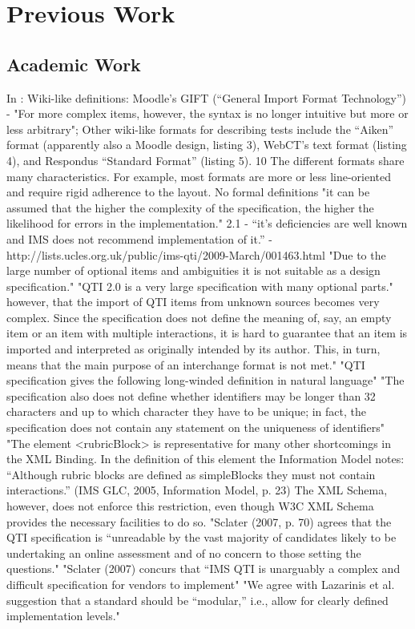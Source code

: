 \chapter{Previous Work} 
\label{Chapter:Previous Work}
\section{Academic Work} 
\label{Section:Academic Work}

\newif\ifnote
\notefalse
\ifnote
In \cite{failQTI}:
Wiki-like definitions: Moodle’s GIFT (“General Import Format Technology”) - "For more complex items, however, the syntax is no longer intuitive but more or less arbitrary"; Other wiki-like formats for describing tests include the “Aiken” format (apparently also a Moodle design, listing 3), WebCT’s text format (listing 4), and Respondus “Standard Format” (listing 5). 10 The different formats share many characteristics. For example, most formats are more or less line-oriented and require rigid adherence to the layout. No formal definitions
"it can be assumed that the higher the complexity of the specification, the higher the likelihood for errors in the implementation."
2.1 - “it’s deficiencies are well known and IMS does not recommend implementation of it.” - http://lists.ucles.org.uk/public/ims-qti/2009-March/001463.html
"Due to the large number of optional items and ambiguities it is not suitable as a design specification."
"QTI 2.0 is a very large specification with many optional parts."
however, that the import of QTI items from unknown sources becomes very complex. Since the
specification does not define the meaning of, say, an empty item or an item with multiple interactions,
it is hard to guarantee that an item is imported and interpreted as originally intended by its author. This,
in turn, means that the main purpose of an interchange format is not met."
"QTI specification gives the following long-winded definition in natural language"
"The specification also does not define whether identifiers may be longer than 32 characters and up to which character they have to be unique; in fact, the specification does not contain any statement on the uniqueness of identifiers"
"The element <rubricBlock> is representative for many other shortcomings in the XML Binding. In the definition of this element the Information Model notes: “Although rubric blocks are defined as simpleBlocks they must not contain interactions.” (IMS GLC, 2005, Information Model, p. 23) The XML Schema, however, does not enforce this restriction, even though W3C XML Schema provides the necessary facilities to do so.
"Sclater (2007, p. 70) agrees that the QTI specification is “unreadable by the vast majority of candidates likely to be undertaking an online assessment and of no concern to those setting the questions."
"Sclater (2007) concurs that “IMS QTI is unarguably a complex and difficult specification for
vendors to implement" \citep{Sclater2007}
"We agree with Lazarinis et al. suggestion that a standard should be “modular,” i.e., allow for clearly defined implementation levels."


